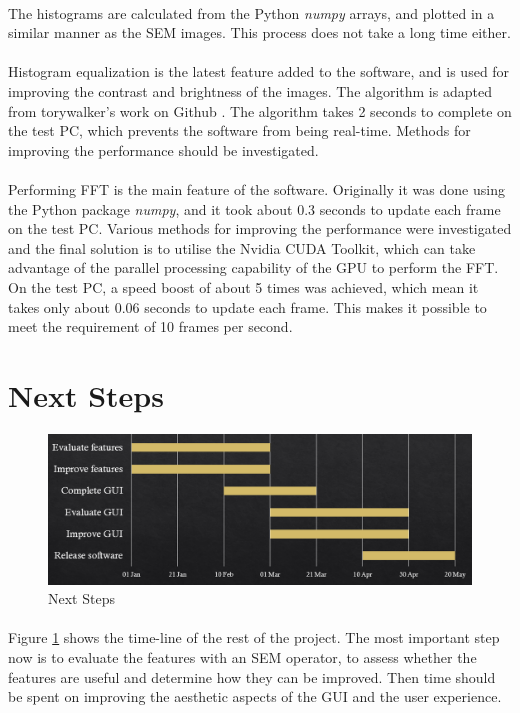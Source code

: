 \documentclass[12pt,a4paper]{article}
\begin{document}
\paragraph{}
The histograms are calculated from the Python \textit{numpy} arrays, and plotted in a similar manner as the SEM images. This process does not take a long time either.

\paragraph{}
Histogram equalization is the latest feature added to the software, and is used for improving the contrast and brightness of the images. The algorithm is adapted from torywalker's work on Github \cite{torywalker}. The algorithm takes 2 seconds to complete on the test PC, which prevents the software from being real-time. Methods for improving the performance should be investigated.

\paragraph{}
Performing FFT is the main feature of the software. Originally it was done using the Python package \textit{numpy}, and it took about 0.3 seconds to update each frame on the test PC. Various methods for improving the performance were investigated and the final solution is to utilise the Nvidia CUDA Toolkit, which can take advantage of the parallel processing capability of the GPU to perform the FFT. On the test PC, a speed boost of about 5 times was  achieved, which mean it takes only about 0.06 seconds to update each frame. This makes it possible to meet the requirement of 10 frames per second.

\section{Next Steps}
\begin{figure}[h!]
  \centering
  \includegraphics[scale=0.5]{"Gantt"}
  \caption{Next Steps}
  \label{fig:Next Steps}
\end{figure}

\paragraph{}
Figure \ref{fig:Next Steps} shows the time-line of the rest of the project. The most important step now is to evaluate the features with an SEM operator, to assess whether the features are useful and determine how they can be improved. Then time should be spent on improving the aesthetic aspects of the GUI and the user experience.

\printbibliography
\end{document}
